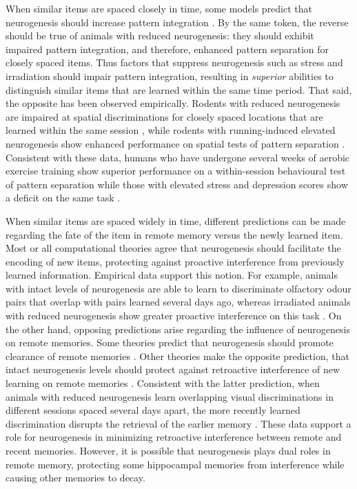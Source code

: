 When similar items are spaced closely in time, some models predict that
neurogenesis should increase pattern
integration \citep{aimone-wiles-gage-06,aimone-wiles-gage-09}.  
By the same token, the reverse
should be true of animals with reduced neurogenesis: they should exhibit
impaired pattern integration, and therefore, enhanced pattern separation for closely
spaced items. 
Thus factors that suppress 
neurogenesis such as stress and
irradiation \citep{gould-tanapat-mcewen-flugge-gross-fuchs-98,wojtowicz-06}
should impair pattern integration, resulting in 
{\em superior} abilities to distinguish similar items that are learned
within the same time period. 
That said, the opposite has been observed
empirically. 
Rodents with reduced neurogenesis are impaired at spatial
discriminations for closely spaced locations that are learned within the same
session \citep{clelland-et-al-09}, while rodents with running-induced elevated neurogenesis show enhanced
performance on spatial tests of pattern
separation \citep{creer-romberg-saksida-vanpraag-bussey-2010}.
Consistent with these data, humans who have
undergone several weeks of aerobic exercise training show superior performance
on a within-session behavioural test of pattern separation while those with
elevated stress and depression scores show a deficit on the same task \citep{dery-pilgrim-gibala-gillen-wojtowicz-macqueen-becker-13}.

When similar items are spaced widely in time, different predictions can be
made regarding the fate of the item in remote memory versus the newly learned item.
Most or all computational theories agree
that neurogenesis should facilitate the encoding of new items, protecting
against proactive interference from previously learned information.
Empirical data support this notion. 
For example, animals with intact levels of
neurogenesis are able to learn to discriminate olfactory odour pairs that
overlap with pairs learned several days ago, whereas irradiated animals with reduced
neurogenesis show greater proactive interference on this
task \citep{luu-sill-gao-becker-wojtowicz-smith-12}.   
On the other hand, opposing predictions arise regarding the influence of
neurogenesis on remote memories. 
Some theories predict that neurogenesis should promote clearance of remote memories
\citep{chambers-potenza-hoffman-miranker-04,deisseroth-singla-toda-monje-palmer-malenka-04,additive_neurogenesis,weisz-argibay-2012}. 
Other theories 
make the opposite prediction, that intact neurogenesis levels should protect
against retroactive 
interference of new learning on remote
memories \citep{replacement_neurogenesis,becker-macqueen-wojtowicz-09}. 
Consistent with the latter prediction, when animals with reduced neurogenesis
learn overlapping visual discriminations in different sessions
spaced several days apart, the more recently learned
discrimination disrupts the retrieval of the earlier memory
\citep{winocur-becker-luu-rosenzweig-wojtowicz-12}. 
These data support a role for
neurogenesis in minimizing retroactive interference between 
remote and recent memories. 
However, it is possible that neurogenesis plays dual roles in remote
memory, protecting some hippocampal memories from 
interference while causing other memories to decay. 

